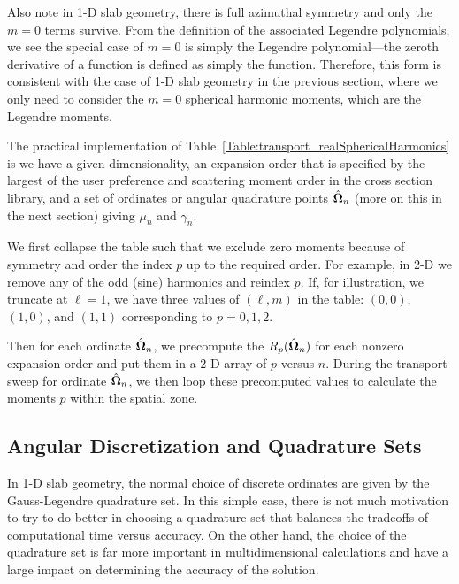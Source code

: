 Also note in 1-D slab geometry, there is full azimuthal symmetry and only the $m = 0$ terms survive. From the definition of the associated Legendre polynomials, we see the special case of $m = 0$ is simply the Legendre polynomial---the zeroth derivative of a function is defined as simply the function. Therefore, this form is consistent with the case of 1-D slab geometry in the previous section, where we only need to consider the $m = 0$ spherical harmonic moments, which are the Legendre moments.

The practical implementation of Table~\ref{Table:transport_realSphericalHarmonics} is we have a given dimensionality, an expansion order that is specified by the largest of the user preference and scattering moment order in the cross section library, and a set of ordinates or angular quadrature points $\hat{\mathbf{\Omega}}_n$ (more on this in the next section) giving $\mu_n$ and $\gamma_n$. 

We first collapse the table such that we exclude zero moments because of symmetry and order the index $p$ up to the required order. For example, in 2-D we remove any of the odd (sine) harmonics and reindex $p$. If, for illustration, we truncate at $\ell = 1$, we have three values of $(\ell,m)$ in the table: $(0,0)$, $(1,0)$, and $(1,1)$ corresponding to $p = 0, 1, 2$.

Then for each ordinate $\hat{\mathbf{\Omega}}_n$, we precompute the $R_p(\hat{\mathbf{\Omega}}_n)$ for each nonzero expansion order and put them in a 2-D array of $p$ versus $n$. During the transport sweep for ordinate $\hat{\mathbf{\Omega}}_n$, we then loop these precomputed values to calculate the moments $p$ within the spatial zone. 





\subsection{Angular Discretization and Quadrature Sets}

In 1-D slab geometry, the normal choice of discrete ordinates are given by the Gauss-Legendre quadrature set. In this simple case, there is not much motivation to try to do better in choosing a quadrature set that balances the tradeoffs of computational time versus accuracy. On the other hand, the choice of the quadrature set is far more important in multidimensional calculations and have a large impact on determining the accuracy of the solution. 

